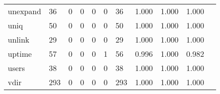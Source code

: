 \begin{longtable}{lp{1.2cm}p{1.2cm}p{1.2cm}p{1.2cm}p{1.2cm}p{1.2cm}p{1.2cm}p{1.2cm}p{1.2cm}p{1.2cm}}
unexpand  &                                    36 &                                                  0 &                                                  0 &                                                  0 &                                                  0 &                                                 36 &                                              1.000 &                                              1.000 &                                              1.000 \\
uniq      &                                    50 &                                                  0 &                                                  0 &                                                  0 &                                                  0 &                                                 50 &                                              1.000 &                                              1.000 &                                              1.000 \\
unlink    &                                    29 &                                                  0 &                                                  0 &                                                  0 &                                                  0 &                                                 29 &                                              1.000 &                                              1.000 &                                              1.000 \\
uptime    &                                    57 &                                                  0 &                                                  0 &                                                  0 &                                                  1 &                                                 56 &                                              0.996 &                                              1.000 &                                              0.982 \\
users     &                                    38 &                                                  0 &                                                  0 &                                                  0 &                                                  0 &                                                 38 &                                              1.000 &                                              1.000 &                                              1.000 \\
vdir      &                                   293 &                                                  0 &                                                  0 &                                                  0 &                                                  0 &                                                293 &                                              1.000 &                                              1.000 &                                              1.000 \\

\end{longtable}
